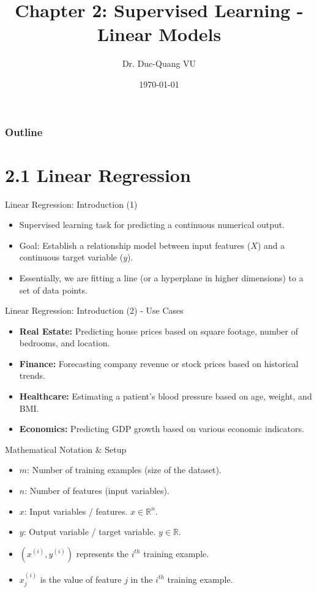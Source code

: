 \documentclass[aspectratio=169]{beamer}
\title{Chapter 2: Supervised Learning - Linear Models}
\author{Dr. Duc-Quang VU}
\institute{Machine Learning Course}
\date{\today}
\begin{document}
\frame{\titlepage}

\begin{frame}
\frametitle{Outline}
\tableofcontents
\end{frame}

\section{2.1 Linear Regression}

\begin{frame}{Linear Regression: Introduction (1)}
\begin{itemize}
    \item Supervised learning task for predicting a continuous numerical output.
    \item Goal: Establish a relationship model between input features ($X$) and a continuous target variable ($y$).
    \item Essentially, we are fitting a line (or a hyperplane in higher dimensions) to a set of data points.
\end{itemize}
\end{frame}

\begin{frame}{Linear Regression: Introduction (2) - Use Cases}
\begin{itemize}
    \item \textbf{Real Estate:} Predicting house prices based on square footage, number of bedrooms, and location.
    \item \textbf{Finance:} Forecasting company revenue or stock prices based on historical trends.
    \item \textbf{Healthcare:} Estimating a patient's blood pressure based on age, weight, and BMI.
    \item \textbf{Economics:} Predicting GDP growth based on various economic indicators.
\end{itemize}
\end{frame}

\begin{frame}{Mathematical Notation \& Setup}
\begin{itemize}
    \item $m$: Number of training examples (size of the dataset).
    \item $n$: Number of features (input variables).
    \item $x$: Input variables / features. $x \in \mathbb{R}^n$.
    \item $y$: Output variable / target variable. $y \in \mathbb{R}$.
    \item $(x^{(i)}, y^{(i)})$ represents the $i^{th}$ training example.
    \item $x_j^{(i)}$ is the value of feature $j$ in the $i^{th}$ training example.
\end{itemize}
\end{frame}
\end{document}

